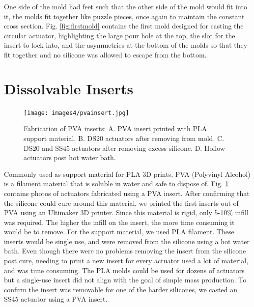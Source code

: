 One side of the mold had feet such that the other side of the mold would fit into it, the molds fit together like puzzle pieces, once again to maintain the constant cross section. Fig. \ref{fig:firstmold} contains the first mold designed for casting the circular actuator, highlighting the large pour hole at the top, the slot for the insert to lock into, and the asymmetries at the bottom of the molds so that they fit together and no silicone was allowed to escape from the bottom. 

\section{Dissolvable Inserts}

\begin{figure}[h]
    \centering
    \texttt{[image: images4/pvainsert.jpg]}
    \caption{Fabrication of PVA inserts: A. PVA insert printed with PLA support material. B. DS20 actuators after removing from mold. C. DS20 and SS45 actuators after removing excess silicone. D. Hollow actuators post hot water bath.}
    \label{fig:pvainsert}
\end{figure}

Commonly used as support material for PLA 3D prints, PVA (Polyvinyl Alcohol) is a filament material that is soluble in water and safe to dispose of. Fig. \ref{fig:pvainsert} contains photos of actuators fabricated using a PVA insert.  After confirming that the silicone could cure around this material, we printed the first inserts out of PVA using an Ultimaker 3D printer. Since this material is rigid, only 5-10\% infill was required. The higher the infill on the insert, the more time consuming it would be to remove. For the support material, we used PLA filament. These inserts would be single use, and were removed from the silicone using a hot water bath. Even though there were no problems removing the insert from the silicone post cure, needing to print a new insert for every actuator used a lot of material, and was time consuming. The PLA molds could be used for dozens of actuators but a single-use insert did not align with the goal of simple mass production. To confirm the insert was removable for one of the harder silicones, we casted an SS45 actuator using a PVA insert.  

